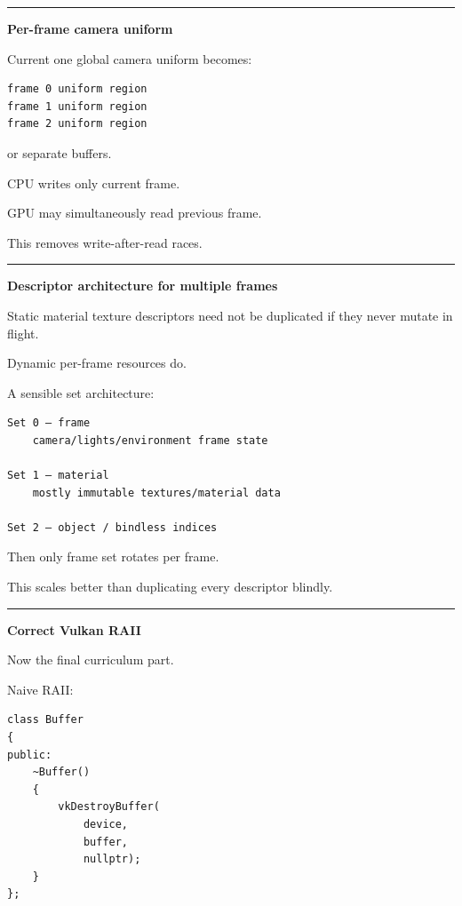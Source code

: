 \begin{center}\rule{0.5\linewidth}{0.5pt}\end{center}

\textbf{Per-frame camera uniform}

Current one global camera uniform becomes:

\begin{verbatim}
frame 0 uniform region
frame 1 uniform region
frame 2 uniform region
\end{verbatim}

or separate buffers.

CPU writes only current frame.

GPU may simultaneously read previous frame.

This removes write-after-read races.

\begin{center}\rule{0.5\linewidth}{0.5pt}\end{center}

\textbf{Descriptor architecture for multiple frames}

Static material texture descriptors need not be duplicated if they never mutate in flight.

Dynamic per-frame resources do.

A sensible set architecture:

\begin{verbatim}
Set 0 — frame
    camera/lights/environment frame state

Set 1 — material
    mostly immutable textures/material data

Set 2 — object / bindless indices
\end{verbatim}

Then only frame set rotates per frame.

This scales better than duplicating every descriptor blindly.

\begin{center}\rule{0.5\linewidth}{0.5pt}\end{center}

\textbf{Correct Vulkan RAII}

Now the final curriculum part.

Naive RAII:

\begin{verbatim}
class Buffer
{
public:
    ~Buffer()
    {
        vkDestroyBuffer(
            device,
            buffer,
            nullptr);
    }
};
\end{verbatim}

